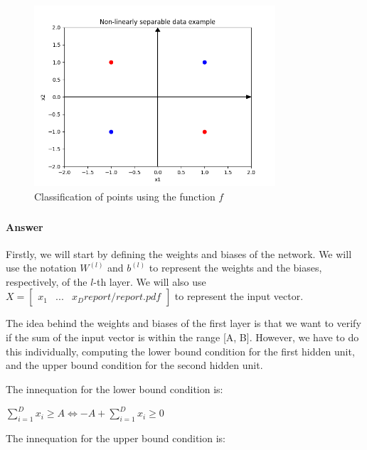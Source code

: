 \documentclass{article}
\begin{document}
\begin{figure}[H]
    \centering
    \includegraphics[width=0.8\textwidth]{"plots/3a.png"}
    \caption{Classification of points using the function \( f \)}
    \label{3a Plot}
\end{figure}
\subsubsection{}
\paragraph{Answer}

Firstly, we will start by defining the weights and biases of the network. We will use the notation
\( W^{(l)} \) and \( b^{(l)} \) to represent the weights and the biases, respectively, of the \( l \)-th layer. 
We will also use $X = \begin{bmatrix}
    x_1 & ... & x_Dreport/report.pdf
\end{bmatrix}
$ to represent the input vector.

\bigskip

The idea behind the weights and biases of the first layer is that we want to verify if the sum of the input vector is within the range [A, B].
However, we have to do this individually, computing the lower bound condition for the first hidden unit, 
and the upper bound condition for the second hidden unit.

\bigskip

The innequation for the lower bound condition is:

\bigskip

$ \sum_{i=1}^{D} x_i \geq A \iff -A + \sum_{i=1}^{D} x_i \geq 0$

The innequation for the upper bound condition is:
\end{document}

